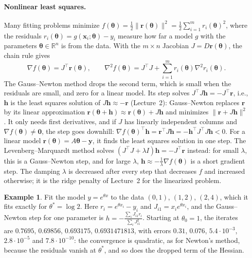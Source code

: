 \documentclass[11pt]{article}
\newcommand{\norm}[1]{\lVert #1 \rVert}
\theoremstyle{definition}
\newtheorem{example}[definition]{Example}
\theoremstyle{plain}
\theoremstyle{remark}
\begin{document}
\paragraph{Nonlinear least squares.} Many fitting problems minimize $f(\boldsymbol{\theta}) = \frac{1}{2}\norm{\mathbf{r}(\boldsymbol{\theta})}^2 = \frac{1}{2}\sum_{i=1}^m r_i(\boldsymbol{\theta})^2$, where the residuals $r_i(\boldsymbol{\theta}) = g(\mathbf{x}_i; \boldsymbol{\theta}) - y_i$ measure how far a model $g$ with the parameters $\boldsymbol{\theta} \in \mathbb{R}^n$ is from the data. With the $m \times n$ Jacobian $J = D\mathbf{r}(\boldsymbol{\theta})$, the chain rule gives
\[\nabla f(\boldsymbol{\theta}) = J^\top\mathbf{r}(\boldsymbol{\theta}), \qquad \nabla^2 f(\boldsymbol{\theta}) = J^\top J + \sum_{i=1}^m r_i(\boldsymbol{\theta})\nabla^2 r_i(\boldsymbol{\theta}).\]
The Gauss--Newton method drops the second term, which is small when the residuals are small, and zero for a linear model. Its step solves $J^\top J\mathbf{h} = -J^\top\mathbf{r}$, i.e., $\mathbf{h}$ is the least squares solution of $J\mathbf{h} \approx -\mathbf{r}$ (Lecture~2): Gauss--Newton replaces $\mathbf{r}$ by its linear approximation $\mathbf{r}(\boldsymbol{\theta} + \mathbf{h}) \approx \mathbf{r}(\boldsymbol{\theta}) + J\mathbf{h}$ and minimizes $\norm{\mathbf{r} + J\mathbf{h}}^2$. It only needs first derivatives, and if $J$ has linearly independent columns and $\nabla f(\boldsymbol{\theta}) \neq \mathbf{0}$, the step goes downhill: $\nabla f(\boldsymbol{\theta})^\top\mathbf{h} = \mathbf{r}^\top J\mathbf{h} = -\mathbf{h}^\top J^\top J\mathbf{h} < 0$. For a linear model $\mathbf{r}(\boldsymbol{\theta}) = A\boldsymbol{\theta} - \mathbf{y}$, it finds the least squares solution in one step. The Levenberg--Marquardt method solves $(J^\top J + \lambda I)\mathbf{h} = -J^\top\mathbf{r}$ instead: for small $\lambda$, this is a Gauss--Newton step, and for large $\lambda$, $\mathbf{h} \approx -\frac{1}{\lambda}\nabla f(\boldsymbol{\theta})$ is a short gradient step. The damping $\lambda$ is decreased after every step that decreases $f$ and increased otherwise; it is the ridge penalty of Lecture~2 for the linearized problem.

\begin{example}\label{ex:gauss-newton}
    Fit the model $y = e^{\theta x}$ to the data $(0, 1)$, $(1, 2)$, $(2, 4)$, which it fits exactly for $\theta^* = \log 2$. Here $r_i = e^{\theta x_i} - y_i$ and $J_{i1} = x_ie^{\theta x_i}$, and the Gauss--Newton step for one parameter is $h = -\frac{\sum_i J_{i1}r_i}{\sum_i J_{i1}^2}$. Starting at $\theta_0 = 1$, the iterates are $0.7695$, $0.69856$, $0.693175$, $0.6931471813$, with errors $0.31$, $0.076$, $5.4 \cdot 10^{-3}$, $2.8 \cdot 10^{-5}$ and $7.8 \cdot 10^{-10}$: the convergence is quadratic, as for Newton's method, because the residuals vanish at $\theta^*$, and so does the dropped term of the Hessian.
\end{example}
\end{document}
